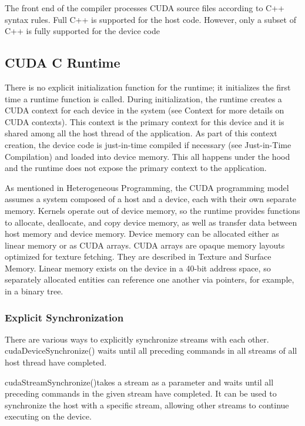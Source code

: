 The front end of the compiler processes CUDA source files according to C++
syntax rules. Full C++ is supported for the host code. However, only a subset
of C++ is fully supported for the device code~\cite[p.~3.1.5]{CUDA18}
%
\subsection{CUDA C Runtime}%
There is no explicit initialization function for the runtime; it initializes
the first time a runtime function is called. During initialization, the runtime
creates a CUDA context for each device in the system (see Context for more
details on CUDA contexts). This context is the primary context for this device
and it is shared among all the host thread of the application. As
part of this context creation, the device code is just-in-time compiled if
necessary (see Just-in-Time Compilation) and loaded into device memory. This
all happens under the hood and the runtime does not expose the primary context
to the application.~\cite[p.~3.2.1]{CUDA18}

As mentioned in Heterogeneous Programming, the CUDA programming model assumes a
system composed of a host and a device, each with their own separate memory.
Kernels operate out of device memory, so the runtime provides functions to
allocate, deallocate, and copy device memory, as well as transfer data between
host memory and device memory. Device memory can be allocated either as linear
memory or as CUDA arrays. CUDA arrays are opaque memory layouts optimized for
texture fetching. They are described in Texture and Surface Memory. Linear
memory exists on the device in a 40-bit address space, so separately allocated
entities can reference one another via pointers, for example, in a binary
tree.~\cite[p.~3.2.2]{CUDA18}
%
\subsubsection{Explicit Synchronization}%
There are various ways to explicitly synchronize streams with each other.
cudaDeviceSynchronize() waits until all preceding commands in all streams of
all host thread have completed.

cudaStreamSynchronize()takes a stream as a parameter and waits until all
preceding commands in the given stream have completed. It can be used to
synchronize the host with a specific stream, allowing other streams to
continue executing on the device.


